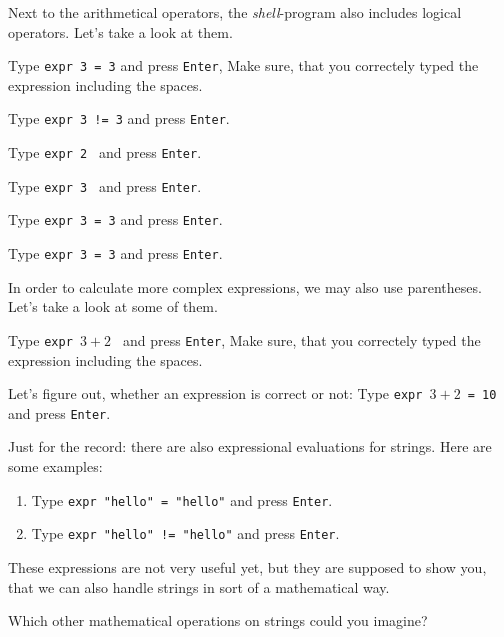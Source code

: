 \begin{challenge}
    \begin{task}
        Next to the arithmetical operators, the \textit{shell}-program also includes logical operators.
        Let's take a look at them.
        \begin{questions}
            \item Type \texttt{expr 3 = 3} and press \texttt{Enter}, Make sure, that you correctely typed the expression including the spaces.
            \item Type \texttt{expr 3 != 3} and press \texttt{Enter}.
            \item Type \texttt{expr 2 } and press \texttt{Enter}.
            \item Type \texttt{expr 3 } and press \texttt{Enter}.
            \item Type \texttt{expr 3 \>= 3} and press \texttt{Enter}.
            \item Type \texttt{expr 3 \<= 3} and press \texttt{Enter}.
        \end{questions}
    \end{task}

    \begin{task}
        In order to calculate more complex expressions, we may also use parentheses.
        Let's take a look at some of them.
        \begin{questions}
            \item Type \texttt{expr \( 3 + 2 \) } and press \texttt{Enter}, Make sure, that you correctely typed the expression including the spaces.
            \item Let's figure out, whether an expression is correct or not: Type \texttt{expr \( 3 + 2 \)  = 10} and press \texttt{Enter}.
        \end{questions}
    \end{task}

    \begin{task}
        Just for the record: there are also expressional evaluations for strings.
        Here are some examples:
        \begin{enumerate}
            \item Type \texttt{expr "hello" = "hello"} and press \texttt{Enter}.
            \item Type \texttt{expr "hello" != "hello"} and press \texttt{Enter}.
        \end{enumerate}
        These expressions are not very useful yet, but they are supposed to show you, that we can also handle strings in sort of a mathematical way.
        \begin{questions}
            \item Which other mathematical operations on strings could you imagine?
        \end{questions}
    \end{task}


\end{challenge}
